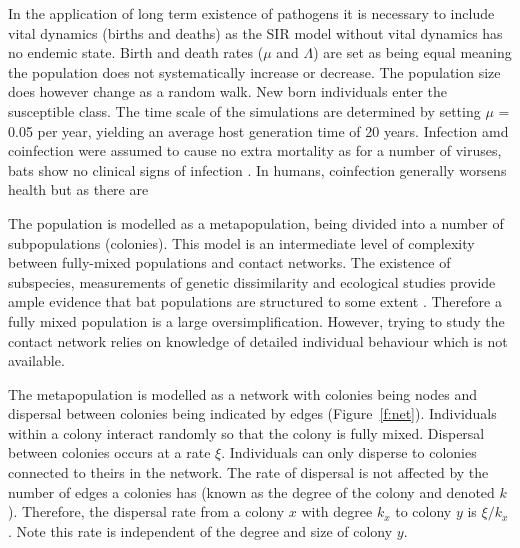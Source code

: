 In the application of long term existence of pathogens it is necessary to include vital dynamics (births and deaths) as the SIR model without vital dynamics has no endemic state.
Birth and death rates ($\mu$ and $\Lambda$) are set as being equal meaning the population does not systematically increase or decrease.
The population size does however change as a random walk.
New born individuals enter the susceptible class.
The time scale of the simulations are determined by setting $\mu$ = 0.05 per year, yielding an average host generation time of 20 years.
Infection amd coinfection were assumed to cause no extra mortality as for a number of viruses, bats show no clinical signs of infection \cite{halpin2011pteropid, deThoisy2016bioecological}.
In humans, coinfection generally worsens health \cite{griffiths2011nature} but as there are 



The population is modelled as a metapopulation, being divided into a number of subpopulations (colonies).
This model is an intermediate level of complexity between fully-mixed populations and contact networks.
The existence of subspecies, measurements of genetic dissimilarity and ecological studies provide ample evidence that bat populations are structured to some extent \cite{kerth2011bats, mccracken1981social, burns2014correlates, wilson2005mammal}.
Therefore a fully mixed population is a large oversimplification.
However, trying to study the contact network relies on knowledge of detailed individual behaviour which is not available.		

The metapopulation is modelled as a network with colonies being nodes and dispersal between colonies being indicated by edges (Figure~\ref{f:net}).
Individuals within a colony interact randomly so that the colony is fully mixed.
Dispersal between colonies occurs at a rate $\xi$.
Individuals can only disperse to colonies connected to theirs in the network.
The rate of dispersal is not affected by the number of edges a colonies has (known as the degree of the colony and denoted $k$).
Therefore, the dispersal rate from a colony $x$ with degree $k_x$ to colony $y$ is $\xi / k_x$.
Note this rate is independent of the degree and size of colony $y$.





